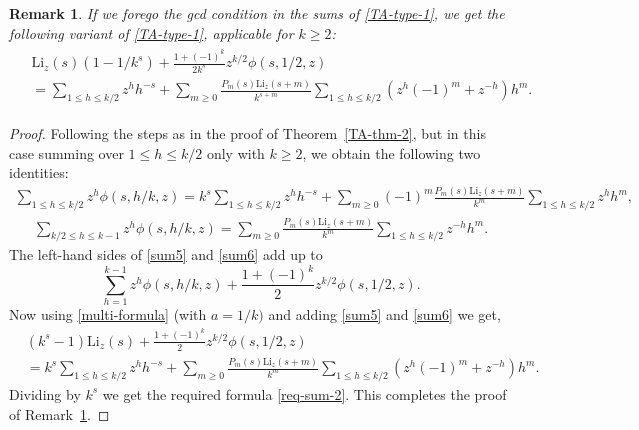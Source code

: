 \documentclass[12pt]{amsart}
\newtheorem{rmk}{Remark}
\newcommand{\thmref}[1]{Theorem~\ref{#1}}
\newcommand{\rmkref}[1]{Remark~\ref{#1}}
\begin{document}
\begin{rmk}\label{rmk-trans-formula}\rm
If we forego the gcd condition in the sums of \eqref{TA-type-1}, we get the following variant of \eqref{TA-type-1}, applicable for $k \ge 2$:
\begin{align}\label{req-sum-2}
\begin{split}
&\mathrm{Li}_{z}(s)(1-1/k^s)+\frac{1+(-1)^k}{2k^s}z^{k/2}\phi(s,1/2,z)\\
&=\sum_{1\leq h\leq k/2 }z^hh^{-s}+\sum_{m\geq0}\frac{P_m(s)\mathrm{Li}_z(s+m)}{k^{s+m}}\sum_{1\leq h\leq k/2}\left(z^h(-1)^m+z^{-h}\right)h^m.
\end{split}
\end{align}
\end{rmk}

\begin{proof}%
Following the steps as in the proof of \thmref{TA-thm-2}, but in this case summing over $1\leq h\leq k/2$ only with $k\geq2$, 
we obtain the following two identities:
\begin{align}\label{sum5}
\sum_{1\leq h\leq k/2 }z^h\phi(s,h/k,z)=k^s\sum_{1\leq h\leq k/2 }z^hh^{-s}
+\sum_{m\geq0}(-1)^m\frac{P_m(s)\mathrm{Li}_z(s+m)}{k^m}\sum_{1\leq h\leq k/2}z^hh^m,
\end{align}
\begin{align}\label{sum6}
\sum_{k/2\leq h\leq k-1 }z^h\phi(s,h/k,z)=\sum_{m\geq0}\frac{P_m(s)\mathrm{Li}_z(s+m)}{k^m}\sum_{1\leq h\leq k/2}z^{-h}h^m.
\end{align}
The left-hand sides of \eqref{sum5} and \eqref{sum6} add up to
$$
\sum_{h=1}^{k-1}z^h\phi(s,h/k,z) + \frac{1+(-1)^k}{2}z^{k/2}\phi(s,1/2,z).
$$
Now using \eqref{multi-formula} (with $a=1/k)$ and adding \eqref{sum5} and \eqref{sum6} we get,
\begin{align*}
&(k^s-1)\mathrm{Li}_z(s)+\frac{1+(-1)^k}{2}z^{k/2}\phi(s,1/2,z)\\
&=k^s\sum_{1\leq h\leq k/2 }z^hh^{-s}+\sum_{m\geq0}\frac{P_m(s)\mathrm{Li}_z(s+m)}{k^m}\sum_{1\leq h\leq k/2}\left(z^h(-1)^m+z^{-h}\right)h^m.
\end{align*}
Dividing by $k^{s}$ we get the required formula \eqref{req-sum-2}. 
This completes the proof of \rmkref{rmk-trans-formula}.
\end{proof}
\end{document}
